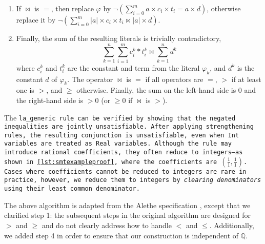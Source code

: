 \begin{algorithm}[!t]
\begin{enumerate}
    \item If $\bowtie$ is $=$, then replace $\varphi$ by
    $\neg (\sum_{i=0}^{m}a\times{}c_i\times{}t_i = a\times{}d)$, otherwise replace it by
    $\neg (\sum_{i=0}^{m}|a|\times{}c_i\times{}t_i \bowtie |a|\times{}d)$.

    \item Finally, the sum of the resulting literals is trivially contradictory,
    \[
        \sum_{k=1}^{n}\sum_{i=1}^{m}c_i^k*t_i^k \bowtie \sum_{k=1}^{n}d^k
    \]
  where $c_i^k$ and $t_i^k$ are the constant and term from the literal $\varphi_k$, and $d^k$ is the constant $d$ of $\varphi_k$.
  The operator $\bowtie$ is $=$ if all operators are $=$, $>$ if at least one is $>$, and $\geq$ otherwise.
  Finally, the sum on the left-hand side is $0$ and the right-hand side is $>0$ (or $\geq 0$ if $\bowtie$ is $>$).
\end{enumerate}
\end{algorithm}

The \tt{la\_generic} rule can be verified by showing that the negated inequalities are jointly unsatisfiable.
After applying strengthening rules, the resulting conjunction is unsatisfiable,
even when \lstinline[language=SMT,basicstyle=\ttfamily\footnotesize\upshape]{Int} variables are treated as \lstinline[language=SMT,basicstyle=\ttfamily\footnotesize\upshape]{Real} variables.
Although the rule may introduce rational coefficients, they often reduce to integers—as shown in \cref{lst:smtexampleproof}, where the coefficients are $(\frac{1}{1}, \frac{1}{1})$.
Cases where coefficients cannot be reduced to integers are rare in practice, however, we reduce them to integers by \emph{clearing denominators} using their least common denominator.


The above algorithm is adapted from the Alethe specification \cite{alethespec}, except that we clarified step 1: the subsequent steps in the original algorithm are designed for $>$ and $\geq$ and do not clearly address how to handle $<$ and $\leq$.
Additionally, we added step 4 in order to ensure that our construction is independent of $\mathbb{Q}$.

